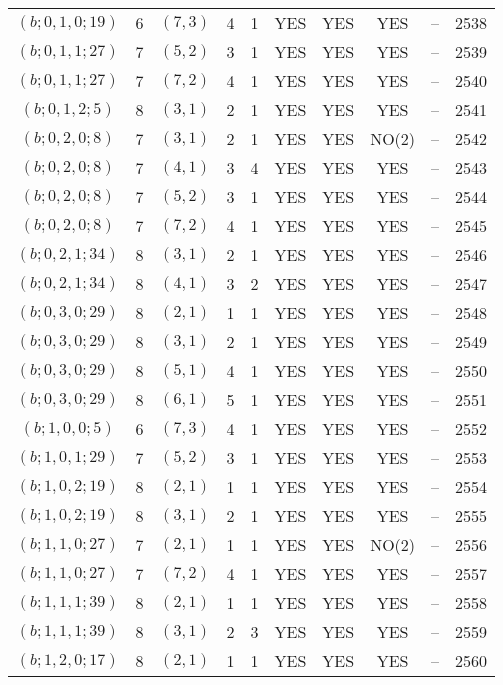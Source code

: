 \begin{longtable}{|c|c|c|c|c|c|c|c|c|c|}
$(b; 0, 1, 0; 19)$ & 6 & $(7, 3)$ & 4 & 1 & YES & YES & YES & -- & 2538\\
$(b; 0, 1, 1; 27)$ & 7 & $(5, 2)$ & 3 & 1 & YES & YES & YES & -- & 2539\\
$(b; 0, 1, 1; 27)$ & 7 & $(7, 2)$ & 4 & 1 & YES & YES & YES & -- & 2540\\
$(b; 0, 1, 2; 5)$ & 8 & $(3, 1)$ & 2 & 1 & YES & YES & YES & -- & 2541\\
$(b; 0, 2, 0; 8)$ & 7 & $(3, 1)$ & 2 & 1 & YES & YES & NO(2) & -- & 2542\\
$(b; 0, 2, 0; 8)$ & 7 & $(4, 1)$ & 3 & 4 & YES & YES & YES & -- & 2543\\
$(b; 0, 2, 0; 8)$ & 7 & $(5, 2)$ & 3 & 1 & YES & YES & YES & -- & 2544\\
$(b; 0, 2, 0; 8)$ & 7 & $(7, 2)$ & 4 & 1 & YES & YES & YES & -- & 2545\\
$(b; 0, 2, 1; 34)$ & 8 & $(3, 1)$ & 2 & 1 & YES & YES & YES & -- & 2546\\
$(b; 0, 2, 1; 34)$ & 8 & $(4, 1)$ & 3 & 2 & YES & YES & YES & -- & 2547\\
$(b; 0, 3, 0; 29)$ & 8 & $(2, 1)$ & 1 & 1 & YES & YES & YES & -- & 2548\\
$(b; 0, 3, 0; 29)$ & 8 & $(3, 1)$ & 2 & 1 & YES & YES & YES & -- & 2549\\
$(b; 0, 3, 0; 29)$ & 8 & $(5, 1)$ & 4 & 1 & YES & YES & YES & -- & 2550\\
$(b; 0, 3, 0; 29)$ & 8 & $(6, 1)$ & 5 & 1 & YES & YES & YES & -- & 2551\\
$(b; 1, 0, 0; 5)$ & 6 & $(7, 3)$ & 4 & 1 & YES & YES & YES & -- & 2552\\
$(b; 1, 0, 1; 29)$ & 7 & $(5, 2)$ & 3 & 1 & YES & YES & YES & -- & 2553\\
$(b; 1, 0, 2; 19)$ & 8 & $(2, 1)$ & 1 & 1 & YES & YES & YES & -- & 2554\\
$(b; 1, 0, 2; 19)$ & 8 & $(3, 1)$ & 2 & 1 & YES & YES & YES & -- & 2555\\
$(b; 1, 1, 0; 27)$ & 7 & $(2, 1)$ & 1 & 1 & YES & YES & NO(2) & -- & 2556\\
$(b; 1, 1, 0; 27)$ & 7 & $(7, 2)$ & 4 & 1 & YES & YES & YES & -- & 2557\\
$(b; 1, 1, 1; 39)$ & 8 & $(2, 1)$ & 1 & 1 & YES & YES & YES & -- & 2558\\
$(b; 1, 1, 1; 39)$ & 8 & $(3, 1)$ & 2 & 3 & YES & YES & YES & -- & 2559\\
$(b; 1, 2, 0; 17)$ & 8 & $(2, 1)$ & 1 & 1 & YES & YES & YES & -- & 2560\\

\end{longtable}
